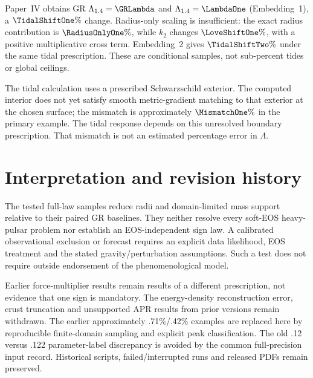 \documentclass[twocolumn,prd,superscriptaddress,nofootinbib]{revtex4-2}
\begin{document}
\begin{table}[t]
\caption{Shared solar-amplitude-peak example. $M_{\rm dom}$ is in solar
masses. The modified domain peaks reach the EOS boundary. Tides include
the additional prescriptions specified in Paper~IV.}
\label{tab:common}\centering\small

\end{table}

Paper~IV obtains GR $\Lambda_{1.4}=\GRLambda$ and
$\Lambda_{1.4}=\LambdaOne$ (Embedding~1), a
$\TidalShiftOne\%$ change. Radius-only scaling is insufficient: the
exact radius contribution is $\RadiusOnlyOne\%$, while $k_2$ changes
$\LoveShiftOne\%$, with a positive multiplicative cross term.
Embedding~2 gives $\TidalShiftTwo\%$ under the same tidal prescription.
These are conditional samples, not sub-percent tides or global ceilings.

The tidal calculation uses a prescribed Schwarzschild exterior. The
computed interior does not yet satisfy smooth metric-gradient matching
to that exterior at the chosen surface; the mismatch is approximately
$\MismatchOne\%$ in the primary example. The tidal response depends on
this unresolved boundary prescription. That mismatch is not an estimated
percentage error in $\Lambda$.

\section{Interpretation and revision history}
The tested full-law samples reduce radii and domain-limited mass support
relative to their paired GR baselines. They neither resolve every soft-EOS
heavy-pulsar problem nor establish an EOS-independent sign law. A calibrated
observational exclusion or forecast requires an explicit data likelihood,
EOS treatment and the stated gravity/perturbation assumptions. Such a test
does not require outside endorsement of the phenomenological model.

Earlier force-multiplier results remain results of a different prescription,
not evidence that one sign is mandatory. The energy-density reconstruction
error, crust truncation and unsupported APR results from prior versions
remain withdrawn. The earlier approximately .71\%/.42\% examples are
replaced here by reproducible finite-domain sampling and explicit peak
classification. The old .12 versus .122 parameter-label discrepancy is
avoided by the common full-precision input record. Historical scripts,
failed/interrupted runs and released PDFs remain preserved.
\end{document}
